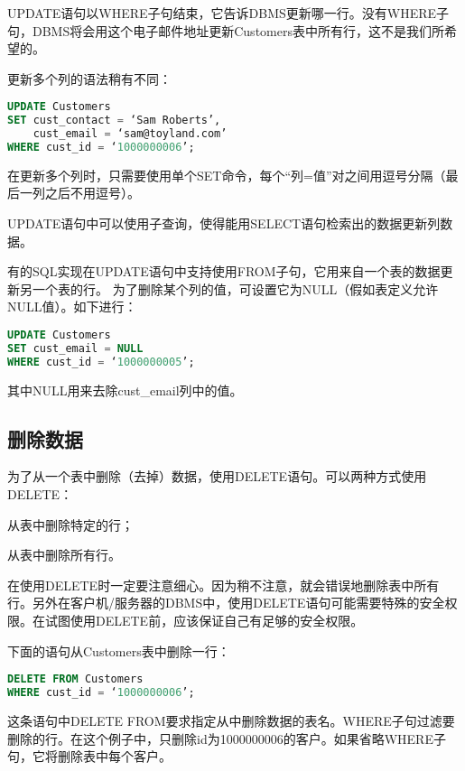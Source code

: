 UPDATE语句以WHERE子句结束，它告诉DBMS更新哪一行。没有WHERE子句，DBMS将会用这个电子邮件地址更新Customers表中所有行，这不是我们所希望的。

更新多个列的语法稍有不同：

\begin{lstlisting}[language=SQL]
UPDATE Customers
SET cust_contact = ‘Sam Roberts’,
	cust_email = ‘sam@toyland.com’
WHERE cust_id = ‘1000000006’;
\end{lstlisting}

在更新多个列时，只需要使用单个SET命令，每个“列=值”对之间用逗号分隔（最后一列之后不用逗号）。

UPDATE语句中可以使用子查询，使得能用SELECT语句检索出的数据更新列数据。

有的SQL实现在UPDATE语句中支持使用FROM子句，它用来自一个表的数据更新另一个表的行。
为了删除某个列的值，可设置它为NULL（假如表定义允许NULL值）。如下进行：

\begin{lstlisting}[language=SQL]
UPDATE Customers
SET cust_email = NULL
WHERE cust_id = ‘1000000005’;
\end{lstlisting}

其中NULL用来去除cust\_email列中的值。

\subsection{删除数据}


为了从一个表中删除（去掉）数据，使用DELETE语句。可以两种方式使用DELETE：

\begin{compactitem}
\item 从表中删除特定的行；
\item 从表中删除所有行。
\end{compactitem}

在使用DELETE时一定要注意细心。因为稍不注意，就会错误地删除表中所有行。另外在客户机/服务器的DBMS中，使用DELETE语句可能需要特殊的安全权限。在试图使用DELETE前，应该保证自己有足够的安全权限。

下面的语句从Customers表中删除一行：

\begin{lstlisting}[language=SQL]
DELETE FROM Customers
WHERE cust_id = ‘1000000006’;
\end{lstlisting}

这条语句中DELETE FROM要求指定从中删除数据的表名。WHERE子句过滤要删除的行。在这个例子中，只删除id为1000000006的客户。如果省略WHERE子句，它将删除表中每个客户。

